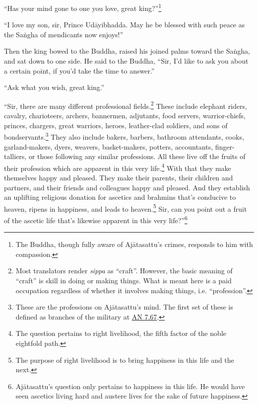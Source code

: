 \documentclass[12pt,openany]{book}%
\begin{document}
“Has your mind gone to one you love, great king?”\footnote{The Buddha, though fully aware of \textsanskrit{Ajātasattu}’s crimes, responds to him with compassion. } 

“I love my son, sir, Prince \textsanskrit{Udāyibhadda}. May he be blessed with such peace as the \textsanskrit{Saṅgha} of mendicants now enjoys!” 

Then the king bowed to the Buddha, raised his joined palms toward the \textsanskrit{Saṅgha}, and sat down to one side. He said to the Buddha, “Sir, I’d like to ask you about a certain point, if you’d take the time to answer.” 

“Ask what you wish, great king.” 

“Sir, there are many different professional fields.\footnote{Most translators render \textit{sippa} as “craft”. However, the basic meaning of “craft” is skill in doing or making things. What is meant here is a paid occupation regardless of whether it involves making things, i.e. “profession”. } These include elephant riders, cavalry, charioteers, archers, bannermen, adjutants, food servers, warrior-chiefs, princes, chargers, great warriors, heroes, leather-clad soldiers, and sons of bondservants.\footnote{These are the professions on \textsanskrit{Ajātasattu}’s mind. The first set of these is defined as branches of the military at \href{https://suttacentral.net/an7.67/en/sujato}{AN 7.67}. } They also include bakers, barbers, bathroom attendants, cooks, garland-makers, dyers, weavers, basket-makers, potters, accountants, finger-talliers, or those following any similar professions. All these live off the fruits of their profession which are apparent in this very life.\footnote{The question pertains to right livelihood, the fifth factor of the noble eightfold path. } With that they make themselves happy and pleased. They make their parents, their children and partners, and their friends and colleagues happy and pleased. And they establish an uplifting religious donation for ascetics and brahmins that’s conducive to heaven, ripens in happiness, and leads to heaven.\footnote{The purpose of right livelihood is to bring happiness in this life and the next. } Sir, can you point out a fruit of the ascetic life that’s likewise apparent in this very life?”\footnote{\textsanskrit{Ajātasattu}’s question only pertains to happiness in this life. He would have seen ascetics living hard and austere lives for the sake of future happiness. } 
\end{document}
